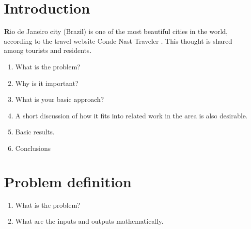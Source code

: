 \section{Introduction}

\lettrine[findent=2pt]{\textbf{R}}{}io de Janeiro city (Brazil) is one of the
most beautiful cities in the world, according to the travel website Conde Nast
Traveler \cite{travelRio}. This thought is shared among tourists and
residents.

\begin{enumerate}
    \item What is the problem? 
    \item Why is it important? 
    \item What is your basic approach? 
    \item A short discussion of how it fits into related work in the area is also desirable.
    \item Basic results. 
    \item Conclusions
\end{enumerate}

\section{Problem definition}

\begin{enumerate}
    \item What is the problem?
    \item What are the inputs and outputs mathematically. 
\end{enumerate}